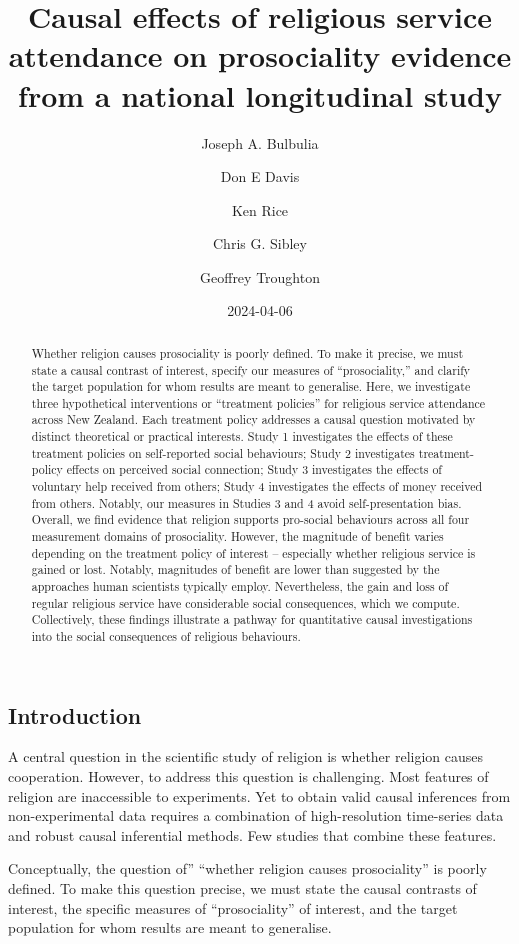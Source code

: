 \documentclass[
  singlecolumn]{article}
\title{Causal effects of religious service attendance on prosociality
evidence from a national longitudinal study}
\author{Joseph A. Bulbulia \and Don E Davis \and Ken Rice \and Chris G.
Sibley \and Geoffrey Troughton}
\date{2024-04-06}
\begin{document}
\maketitle
\begin{abstract}
Whether religion causes prosociality is poorly defined. To make it
precise, we must state a causal contrast of interest, specify our
measures of ``prosociality,'' and clarify the target population for whom
results are meant to generalise. Here, we investigate three hypothetical
interventions or ``treatment policies'' for religious service attendance
across New Zealand. Each treatment policy addresses a causal question
motivated by distinct theoretical or practical interests. Study 1
investigates the effects of these treatment policies on self-reported
social behaviours; Study 2 investigates treatment-policy effects on
perceived social connection; Study 3 investigates the effects of
voluntary help received from others; Study 4 investigates the effects of
money received from others. Notably, our measures in Studies 3 and 4
avoid self-presentation bias. Overall, we find evidence that religion
supports pro-social behaviours across all four measurement domains of
prosociality. However, the magnitude of benefit varies depending on the
treatment policy of interest -- especially whether religious service is
gained or lost. Notably, magnitudes of benefit are lower than suggested
by the approaches human scientists typically employ. Nevertheless, the
gain and loss of regular religious service have considerable social
consequences, which we compute. Collectively, these findings illustrate
a pathway for quantitative causal investigations into the social
consequences of religious behaviours.
\end{abstract}

\subsection{Introduction}\label{introduction}

A central question in the scientific study of religion is whether
religion causes cooperation. However, to address this question is
challenging. Most features of religion are inaccessible to experiments.
Yet to obtain valid causal inferences from non-experimental data
requires a combination of high-resolution time-series data and robust
causal inferential methods. Few studies that combine these features.

Conceptually, the question of'' ``whether religion causes prosociality''
is poorly defined. To make this question precise, we must state the
causal contrasts of interest, the specific measures of ``prosociality''
of interest, and the target population for whom results are meant to
generalise.
\end{document}
